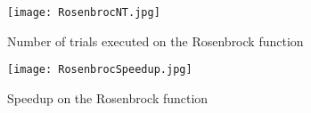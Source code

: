 \documentclass[runningheads]{llncs}
\begin{document}
%
%

\begin{figure}
\begin{center}
  \texttt{[image: RosenbrocNT.jpg]}
  \caption{Number of trials executed on the Rosenbrock function}
  \label{fig:RosenbrocNT}  
\end{center}
\end{figure}

\begin{figure}
\begin{center}
  \texttt{[image: RosenbrocSpeedup.jpg]}
  \caption{Speedup on the Rosenbrock function}
  \label{fig:RosenbrocSpeedup}  
\end{center}
\end{figure}
\end{document}
